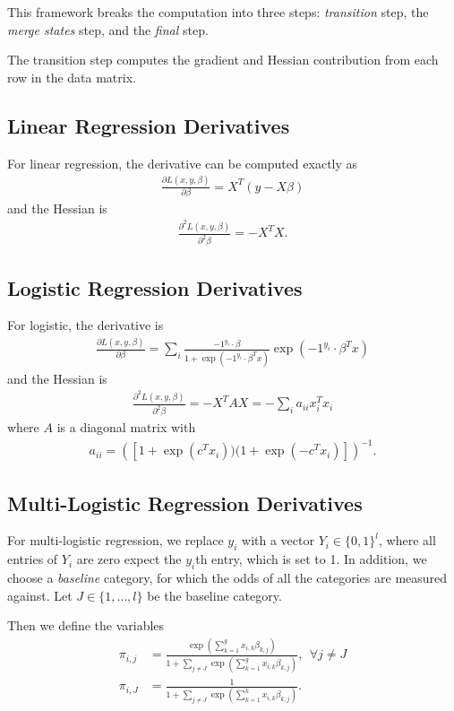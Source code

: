 \documentclass[12pt]{article}
\begin{document}
This framework breaks the computation into three steps: \textit{transition} step, the \textit{merge states} step, and the \textit{final} step.  

The transition step computes the gradient and Hessian contribution from each row in the data matrix.  
\subsection{Linear Regression Derivatives}
For linear regression, the derivative can be computed exactly as 
\begin{align}
\frac{\partial L(x,y,\beta)}{\partial \beta} = X^T(y - X \beta)
\end{align}
and the Hessian is
\begin{align}
\frac{\partial^2 L(x,y,\beta)}{\partial^2 \beta} = -X^TX. 
\end{align}

\subsection{Logistic Regression Derivatives}
For logistic, the derivative is 
\begin{align}
\frac{\partial L(x,y,\beta)}{\partial \beta} = \sum_i \frac{-1^{y_i}\cdot \beta}{1 + \exp(-1^{y_i} \cdot  \beta^Tx)}  \exp(-1^{y_i}\cdot \beta^Tx)
\end{align}
and the Hessian is
\begin{align}
\frac{\partial^2 L(x,y,\beta)}{\partial^2 \beta} = -X^TAX = -\sum_i a_{ii} x_i^T x_i 
\end{align}
where $A$ is a diagonal matrix with 
\begin{align}
a_{ii} = \left( [1 + \exp(c^Tx_i) ) (1 + \exp(-c^Tx_i)] \right)^{-1}.
\end{align}

\subsection{Multi-Logistic Regression Derivatives}
For multi-logistic regression,  we replace $y_i$ with a vector $Y_i \in \{0,1\}^l$, where all entries of $Y_i$ are zero expect the $y_i$th entry, which is set to 1.  In addition, we choose a \textit{baseline} category, for which the odds of all the categories are measured against.  Let $J \in \{1, \dots, l \}$ be the baseline category.  

Then we define the variables
\begin{align}
\pi_{i,j} &= \frac{\exp\left(\sum_{k=1}^g x_{i,k} \beta_{k,j} \right)}{1 + \sum_{j\ne J} \exp \left(\sum_{k=1}^g x_{i,k} \beta_{k,j} \right)}, \ \ \forall j \ne J\\
\pi_{i,J} &= \frac{1}{1 + \sum_{j\ne J} \exp \left(\sum_{k=1}^k x_{i,k} \beta_{k,j} \right)}.
\end{align}
\end{document}
